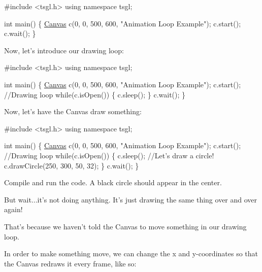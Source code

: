 \begin{DoxyCode}
\textcolor{preprocessor}{#include <tsgl.h>}
\textcolor{keyword}{using namespace }tsgl;

\textcolor{keywordtype}{int} main() \{
  \hyperlink{classtsgl_1_1_canvas}{Canvas} c(0, 0, 500, 600, \textcolor{stringliteral}{"Animation Loop Example"});
  c.start();
  c.wait();
\}
\end{DoxyCode}


Now, let's introduce our drawing loop\-:


\begin{DoxyCode}
\textcolor{preprocessor}{#include <tsgl.h>}
\textcolor{keyword}{using namespace }tsgl;

\textcolor{keywordtype}{int} main() \{
  \hyperlink{classtsgl_1_1_canvas}{Canvas} c(0, 0, 500, 600, \textcolor{stringliteral}{"Animation Loop Example"});
  c.start();
  \textcolor{comment}{//Drawing loop}
  \textcolor{keywordflow}{while}(c.isOpen()) \{
    c.sleep();
  \}
  c.wait();
\}
\end{DoxyCode}


Now, let's have the Canvas draw something\-:


\begin{DoxyCode}
\textcolor{preprocessor}{#include <tsgl.h>}
\textcolor{keyword}{using namespace }tsgl;

\textcolor{keywordtype}{int} main() \{
  \hyperlink{classtsgl_1_1_canvas}{Canvas} c(0, 0, 500, 600, \textcolor{stringliteral}{"Animation Loop Example"});
  c.start();
  \textcolor{comment}{//Drawing loop}
  \textcolor{keywordflow}{while}(c.isOpen()) \{
    c.sleep();
    \textcolor{comment}{//Let's draw a circle!}
    c.drawCircle(250, 300, 50, 32);
  \}
  c.wait();
\}
\end{DoxyCode}


Compile and run the code. A black circle should appear in the center.

But wait...it's not doing anything. It's just drawing the same thing over and over again!

That's because we haven't told the Canvas to move something in our drawing loop.

In order to make something move, we can change the x and y-\/coordinates so that the Canvas redraws it every frame, like so\-:


